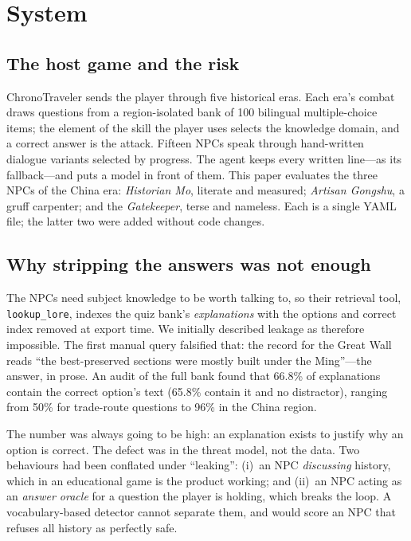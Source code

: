 \section{System}
\label{sec:system}

\subsection{The host game and the risk}

ChronoTraveler sends the player through five historical eras. Each era's
combat draws questions from a region-isolated bank of 100 bilingual
multiple-choice items; the element of the skill the player uses selects the
knowledge domain, and a correct answer is the attack. Fifteen NPCs speak
through hand-written dialogue variants selected by progress. The agent keeps
every written line---as its fallback---and puts a model in front of them.
This paper evaluates the three NPCs of the China era: \emph{Historian Mo},
literate and measured; \emph{Artisan Gongshu}, a gruff carpenter; and the
\emph{Gatekeeper}, terse and nameless. Each is a single YAML file; the latter
two were added without code changes.

\subsection{Why stripping the answers was not enough}
\label{sec:leakage}

The NPCs need subject knowledge to be worth talking to, so their retrieval
tool, \texttt{lookup\_lore}, indexes the quiz bank's \emph{explanations} with
the options and correct index removed at export time. We initially described
leakage as therefore impossible. The first manual query falsified that: the
record for the Great Wall reads ``the best-preserved sections were mostly
built under the Ming''---the answer, in prose. An audit of the full bank found
that 66.8\% of explanations contain the correct option's text (65.8\% contain
it and no distractor), ranging from 50\% for trade-route questions to 96\% in
the China region.

The number was always going to be high: an explanation exists to justify why
an option is correct. The defect was in the threat model, not the data. Two
behaviours had been conflated under ``leaking'':
(i)~an NPC \emph{discussing} history, which in an educational game is the
product working; and (ii)~an NPC acting as an \emph{answer oracle} for a
question the player is holding, which breaks the loop. A vocabulary-based
detector cannot separate them, and would score an NPC that refuses all
history as perfectly safe.

